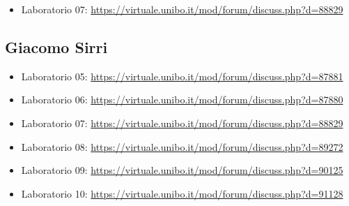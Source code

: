 \documentclass[a4paper,12pt]{report}
\begin{document}
\begin{itemize}
 \item Laboratorio 07: \url{https://virtuale.unibo.it/mod/forum/discuss.php?d=88829}
\end{itemize}

\subsection{Giacomo Sirri}
\begin{itemize}
 \item Laboratorio 05: \url{https://virtuale.unibo.it/mod/forum/discuss.php?d=87881}
 \item Laboratorio 06:
 \url{https://virtuale.unibo.it/mod/forum/discuss.php?d=87880}
 \item Laboratorio 07:
 \url{https://virtuale.unibo.it/mod/forum/discuss.php?d=88829}
 \item Laboratorio 08:
 \url{https://virtuale.unibo.it/mod/forum/discuss.php?d=89272}
 \item Laboratorio 09:
 \url{https://virtuale.unibo.it/mod/forum/discuss.php?d=90125}
 \item Laboratorio 10:
 \url{https://virtuale.unibo.it/mod/forum/discuss.php?d=91128}
\end{itemize}
\end{document}
